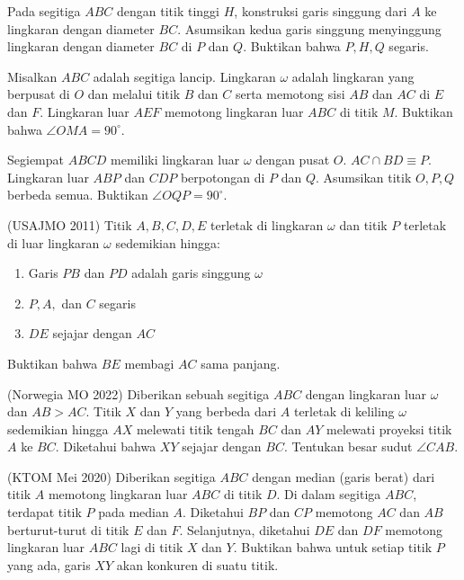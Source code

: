 \documentclass[11pt]{scrartcl}
\begin{document}
\begin{problem}
    Pada segitiga $ABC$ dengan titik tinggi $H$, konstruksi garis singgung dari $A$ ke lingkaran dengan diameter $BC$. Asumsikan kedua garis singgung menyinggung lingkaran dengan diameter $BC$ di $P$ dan $Q$. Buktikan bahwa $P, H, Q$ segaris.
\end{problem}

\begin{problem}
    Misalkan $ABC$ adalah segitiga lancip. Lingkaran $\omega$ adalah lingkaran yang berpusat di $O$ dan melalui titik $B$ dan $C$ serta memotong sisi $AB$ dan $AC$ di $E$ dan $F$. Lingkaran luar $AEF$ memotong lingkaran luar $ABC$ di titik $M$. Buktikan bahwa $\angle{OMA} = 90^{\circ}$.
\end{problem}

\begin{problem}
    Segiempat $ABCD$ memiliki lingkaran luar $\omega$ dengan pusat $O$. $AC \cap BD \equiv P$. Lingkaran luar $ABP$ dan $CDP$ berpotongan di $P$ dan $Q$. Asumsikan titik $O, P, Q$ berbeda semua. Buktikan $\angle{OQP} = 90^{\circ}$.
\end{problem}

\begin{problem}
    (USAJMO 2011) Titik $A, B, C, D, E$ terletak di lingkaran $\omega$ dan titik $P$ terletak di luar lingkaran $\omega$ sedemikian hingga:
    \begin{enumerate}
        \item Garis $PB$ dan $PD$ adalah garis singgung $\omega$
        \item $P, A,$ dan $C$ segaris
        \item $DE$ sejajar dengan $AC$
    \end{enumerate}
    Buktikan bahwa $BE$ membagi $AC$ sama panjang.
\end{problem}

\begin{problem}
    (Norwegia MO 2022) Diberikan sebuah segitiga $ABC$ dengan lingkaran luar $\omega$ dan $AB > AC$. Titik $X$ dan $Y$ yang berbeda dari $A$ terletak di keliling $\omega$ sedemikian hingga $AX$ melewati titik tengah $BC$ dan $AY$ melewati proyeksi titik $A$ ke $BC$. Diketahui bahwa $XY$ sejajar dengan $BC$. Tentukan besar sudut $\angle CAB$.
\end{problem}

\begin{problem}
    (KTOM Mei 2020) Diberikan segitiga $ABC$ dengan median (garis berat) dari titik $A$ memotong lingkaran luar $ABC$ di titik $D$. Di dalam segitiga $ABC$, terdapat titik $P$ pada median $A$. Diketahui $BP$ dan $CP$ memotong $AC$ dan $AB$ berturut-turut di titik $E$ dan $F$. Selanjutnya, diketahui $DE$ dan $DF$ memotong lingkaran luar $ABC$ lagi di titik $X$ dan $Y$. Buktikan bahwa untuk setiap titik $P$ yang ada, garis $XY$ akan konkuren di suatu titik.
\end{problem}
\end{document}
